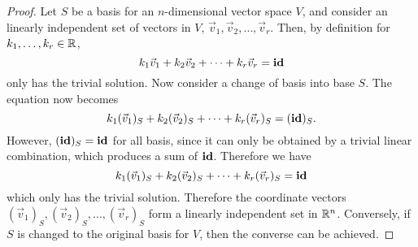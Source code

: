 \documentclass{article}
\begin{document}
\begin{proof}
  Let $S$ be a basis for an $n$-dimensional vector space $V$, and consider an linearly independent set of vectors in $V$, $\vec{v}_1,\vec{v}_2,\ldots,\vec{v}_r$. Then, by definition for $k_1,\ldots,k_r \in \mathbb{R}$,
  \[
    k_1\vec{v}_1 + k_2\vec{v}_2 + \cdots + k_r\vec{v}_r = \operatorname{\textbf{id}}
  \]
  only has the trivial solution. Now consider a change of basis into base $S$. The equation now becomes
  \[
    k_1(\vec{v}_1)_S + k_2(\vec{v}_2)_S + \cdots + k_r(\vec{v}_r)_S = (\operatorname{\textbf{id}})_S.
  \]
  However, $(\operatorname{\textbf{id}})_S = \operatorname{\textbf{id}}$ for all basis, since it can only be obtained by a trivial linear combination, which produces a sum of $\operatorname{\textbf{id}}$. Therefore we have
  \[
    k_1(\vec{v}_1)_S + k_2(\vec{v}_2)_S + \cdots + k_r(\vec{v}_r)_S = \operatorname{\textbf{id}}
  \]
  which only has the trivial solution. Therefore the coordinate vectors $(\vec{v}_1)_S,(\vec{v}_2)_S,\ldots,(\vec{v}_r)_S$ form a linearly independent set in $\mathbb{R}^n$. Conversely, if $S$ is changed to the original basis for $V$, then the converse can be achieved.
\end{proof}
\qdash
\end{document}
